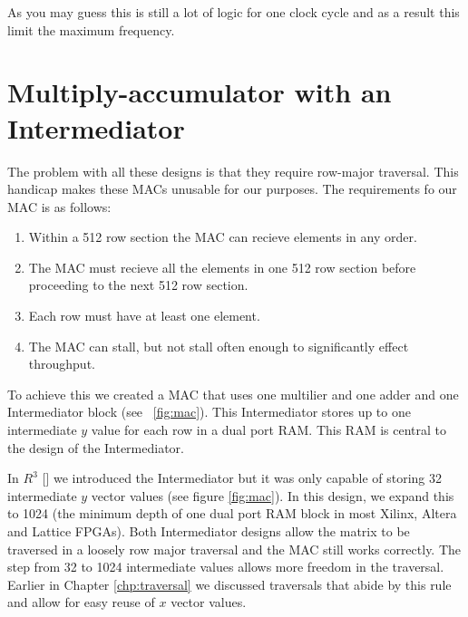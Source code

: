 As you may guess this is still a lot of logic for one clock cycle and as a result this limit the maximum frequency.

\section{Multiply-accumulator with an Intermediator}
\label{sec:intermediator}
The problem with all these designs is that they require row-major traversal. This handicap makes these MACs unusable for our purposes. The requirements fo our MAC is as follows:
\begin{enumerate}
    \item Within a 512 row section the MAC can recieve elements in any order.
    \item The MAC must recieve all the elements in one 512 row section before proceeding to the next 512 row section.
    \item Each row must have at least one element.
    \item The MAC can stall, but not stall often enough to significantly effect throughput.

\end{enumerate}
To achieve this we created a MAC that uses one multilier and one adder and one Intermediator block (see \figurename~\ref{fig:mac}). This Intermediator stores up to one intermediate $y$ value for each row in a dual port RAM. This RAM is central to the design of the Intermediator.

\par In $R^3$ [\cite{prelim:townsend}] we introduced the Intermediator but it was only capable of storing 32 intermediate $y$ vector values (see figure \ref{fig:mac}). In this design, we expand this to 1024 (the minimum depth of one dual port RAM block in most Xilinx, Altera and Lattice FPGAs). Both Intermediator designs allow the matrix to be traversed in a loosely row major traversal and the MAC still works correctly. The step from 32 to 1024 intermediate values allows more freedom in the traversal. Earlier in Chapter \ref{chp:traversal} we discussed traversals that abide by this rule and allow for easy reuse of $x$ vector values.


